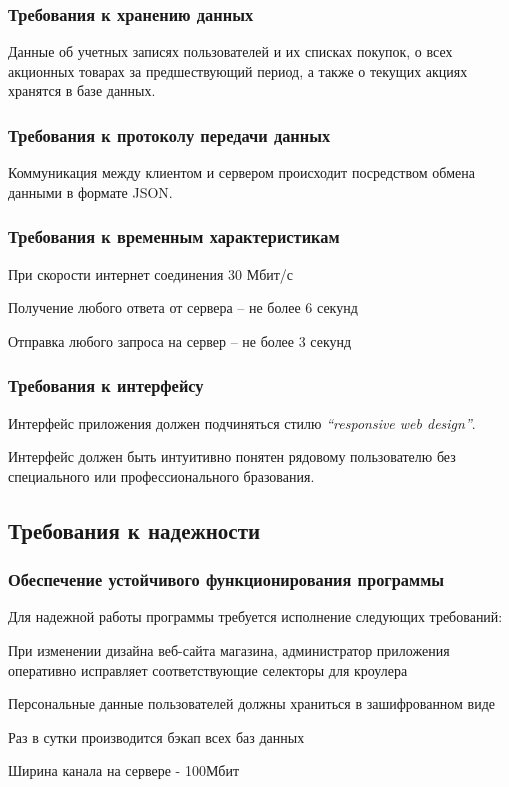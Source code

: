 \subsubsection{Требования к хранению данных}
Данные об учетных записях пользователей и их списках покупок,
о всех акционных товарах за предшествующий период,
а также о текущих акциях
хранятся в базе данных.

\subsubsection{Требования к протоколу передачи данных}
Коммуникация между клиентом и сервером происходит посредством обмена данными в формате JSON.

\subsubsection{Требования к временным характеристикам}
При скорости интернет соединения 30 Мбит/с
\begin{my_enumerate}
\item Получение любого ответа от сервера -- не более 6 секунд
\item Отправка любого запроса на сервер -- не более 3 секунд
\end{my_enumerate}

\subsubsection{Требования к интерфейсу}
\begin{my_enumerate}
  \item Интерфейс приложения должен подчиняться стилю \textit{``responsive web design''}.\cite{wiki_adaptive}
  \item Интерфейс должен быть интуитивно понятен рядовому пользователю без
    специального или профессионального бразования.
\end{my_enumerate}

\subsection{Требования к надежности}

\subsubsection{Обеспечение устойчивого функционирования программы}
Для надежной работы программы требуется исполнение следующих требований:
\begin{my_enumerate}
\item При изменении дизайна веб-сайта магазина, администратор приложения оперативно
исправляет соответствующие селекторы для кроулера
\item Персональные данные пользователей должны храниться в зашифрованном виде
\item Раз в сутки производится бэкап всех баз данных
\item Ширина канала на сервере - 100Мбит
\end{my_enumerate}

